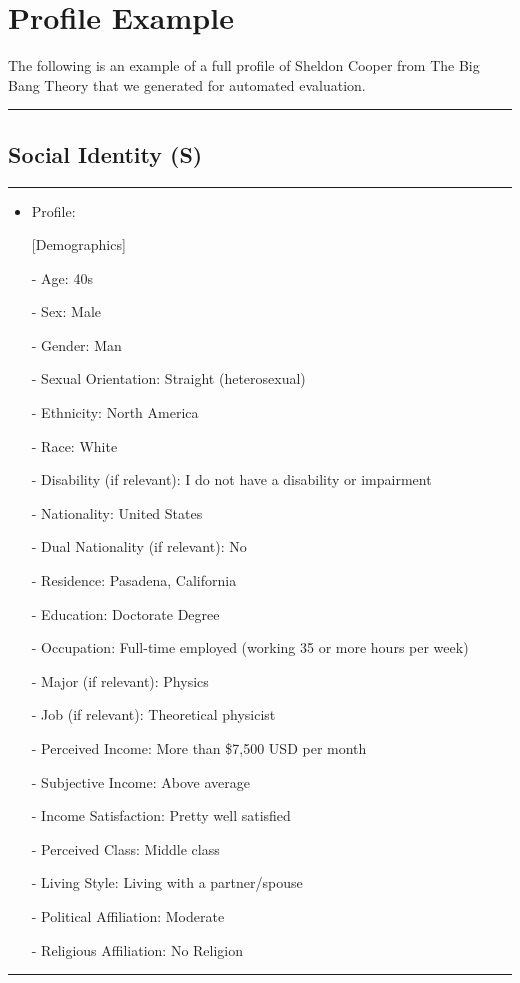 \section{Profile Example}
The following is an example of a full profile of Sheldon Cooper from The Big Bang Theory that we generated for automated evaluation. 

\label{sec:appendix_profile_example}
\noindent\rule{\columnwidth}{0.3mm}
\subsection{Social Identity (S)}
\label{sec:appendix_profile_example_S_A1}
\noindent\rule{\columnwidth}{0.3mm}
\begin{itemize}
\item Profile:

[Demographics]

- Age: 40s

- Sex: Male

- Gender: Man

- Sexual Orientation: Straight (heterosexual)

- Ethnicity: North America

- Race: White

- Disability (if relevant): I do not have a disability or impairment

- Nationality: United States

- Dual Nationality (if relevant): No

- Residence: Pasadena, California

- Education: Doctorate Degree

- Occupation: Full-time employed (working 35 or more hours per week)

- Major (if relevant): Physics

- Job (if relevant): Theoretical physicist

- Perceived Income: More than \$7,500 USD per month

- Subjective Income: Above average

- Income Satisfaction: Pretty well satisfied

- Perceived Class: Middle class

- Living Style: Living with a partner/spouse

- Political Affiliation: Moderate

- Religious Affiliation: No Religion
\label{tab:demo}
\end{itemize}

\noindent\rule{\columnwidth}{0.3mm}
